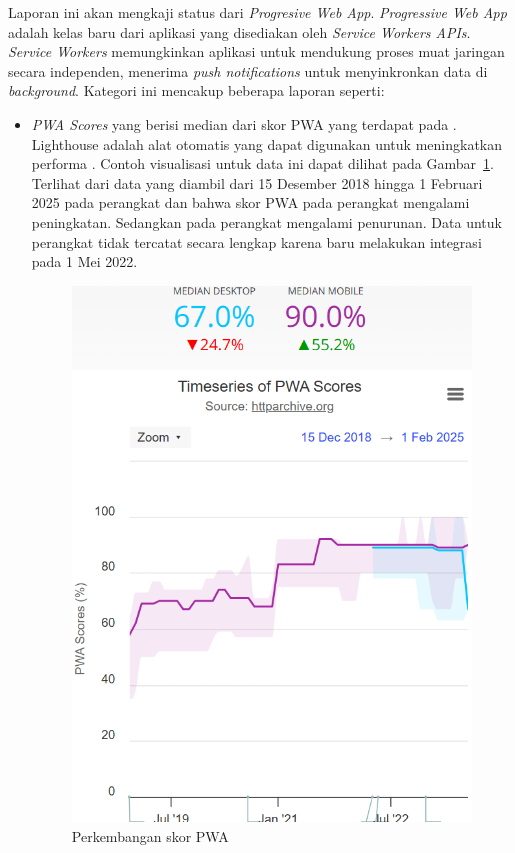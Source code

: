 Laporan ini akan mengkaji status dari \textit{Progresive Web App}. \textit{Progressive Web App} adalah kelas baru dari aplikasi \web yang disediakan oleh \textit{Service Workers APIs}. \textit{Service Workers} memungkinkan aplikasi untuk mendukung proses muat jaringan secara independen, menerima \textit{push notifications} untuk menyinkronkan data di \textit{background}. Kategori ini mencakup beberapa laporan seperti:
\begin{itemize}
    \item \textit{PWA Scores} yang berisi median dari skor PWA yang terdapat pada \light. Lighthouse adalah alat otomatis yang dapat digunakan untuk meningkatkan performa \web. Contoh visualisasi untuk data ini dapat dilihat pada Gambar~\ref{fig:pwascore}. Terlihat dari data yang diambil dari 15 Desember 2018 hingga 1 Februari 2025 pada perangkat \desktop dan \mobile bahwa skor PWA pada perangkat \mobile mengalami peningkatan. Sedangkan pada perangkat \desktop mengalami penurunan. Data untuk perangkat \desktop tidak tercatat secara lengkap karena \light baru melakukan integrasi pada 1 Mei 2022.
    \begin{figure}[H]
        \centering
        \includegraphics[width=0.4\linewidth]{Gambar/Contoh PWA Score.png}
        \caption{Perkembangan skor PWA}
        \label{fig:pwascore}
    \end{figure}


\end{itemize}
